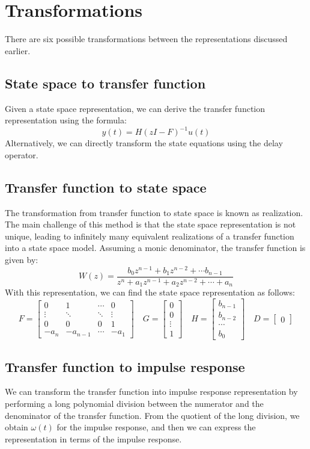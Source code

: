 \section{Transformations}

There are six possible transformations between the representations discussed earlier.

\subsection{State space to transfer function}
Given a state space representation, we can derive the transfer function representation using the formula:
\[y(t)=H{\left(zI-F\right)}^{-1}u(t)\]
Alternatively, we can directly transform the state equations using the delay operator.

\subsection{Transfer function to state space}
The transformation from transfer function to state space is known as realization. 
The main challenge of this method is that the state space representation is not unique, leading to infinitely many equivalent realizations of a transfer function into a state space model. 
Assuming a monic denominator, the transfer function is given by:
\[W(z)=\dfrac{b_0z^{n-1}+b_1z^{n-2}+\cdots b_{n-1}}{z^n+a_1z^{n-1}+a_2z^{n-2}+\cdots+a_n}\]
With this representation, we can find the state space representation as follows:
\[F=\begin{bmatrix} 0 & 1 & \cdots & 0 \\ \vdots & \ddots  & \ddots & \vdots \\ 0 & 0 & 0 & 1 \\ -a_n & -a_{n-1} & \cdots & -a_1 \end{bmatrix} \quad G=\begin{bmatrix} 0 \\ 0 \\ \vdots \\ 1 \end{bmatrix} \quad H=\begin{bmatrix} b_{n-1} \\ b_{n-2} \\ \cdots \\ b_0 \end{bmatrix} \quad D=\begin{bmatrix} 0 \end{bmatrix}\]

\subsection{Transfer function to impulse response}
We can transform the transfer function into impulse response representation by performing a long polynomial division between the numerator and the denominator of the transfer function.
From the quotient of the long division, we obtain $\omega(t)$ for the impulse response, and then we can express the representation in terms of the impulse response. 

